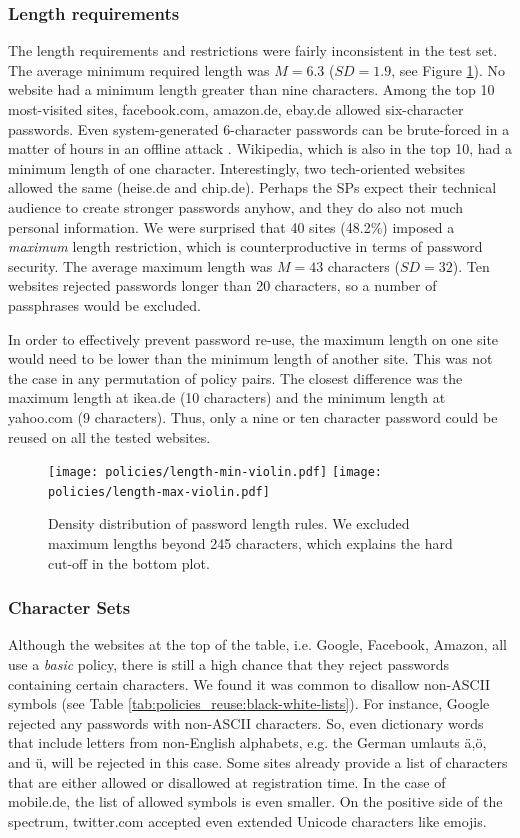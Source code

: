 \subsubsection{Length requirements} 
The length requirements and restrictions were fairly inconsistent in the test set. The average minimum required length was $M=6.3$ ($SD=1.9$, see Figure \ref{fig:policies_reuse:min-max-length}). No website had a minimum length greater than nine characters. Among the top 10 most-visited sites, facebook.com, amazon.de, ebay.de allowed six-character passwords. Even system-generated 6-character passwords can be brute-forced in a matter of hours in an offline attack . Wikipedia, which is also in the top 10, had a minimum length of one character. Interestingly, two tech-oriented websites allowed the same (heise.de and chip.de). Perhaps the \glspl{SP} expect their technical audience to create stronger passwords anyhow, and they do also not much personal information. 
We were surprised that 40 sites (48.2\%) imposed a \textit{maximum} length restriction, which is counterproductive in terms of password security. The average maximum length was $M=43$ characters ($SD=32$). Ten websites rejected passwords longer than 20 characters, so a number of passphrases would be excluded. 

In order to effectively prevent password re-use, the maximum length on one site would need to be lower than the minimum length of another site. This was not the case in any permutation of policy pairs. The closest difference was the maximum length at ikea.de (10 characters) and the minimum length at yahoo.com (9 characters). Thus, only a nine or ten character password could be reused on all the tested websites. 
\begin{figure}[tbph]
	\centering
	\texttt{[image: policies/length-min-violin.pdf]}
	\texttt{[image: policies/length-max-violin.pdf]}
	\caption{\label{fig:policies_reuse:min-max-length}Density distribution of password length rules. We excluded maximum lengths beyond 245 characters, which explains the hard cut-off in the bottom plot.}
\end{figure}

\subsubsection{Character Sets}
Although the websites at the top of the table, i.e. Google, Facebook, Amazon, all use a \textit{basic} policy, there is still a high chance that they reject passwords containing certain characters. We found it was common to disallow non-ASCII symbols (see Table \ref{tab:policies_reuse:black-white-lists}). For instance, Google rejected any passwords with non-ASCII characters. So, even dictionary words that include letters from non-English alphabets, e.g. the German umlauts ä,ö, and ü, will be rejected in this case. Some sites already provide a list of characters that are either allowed or disallowed at registration time. In the case of mobile.de, the list of allowed symbols is even smaller. On the positive side of the spectrum, twitter.com accepted even extended Unicode characters like emojis. 

